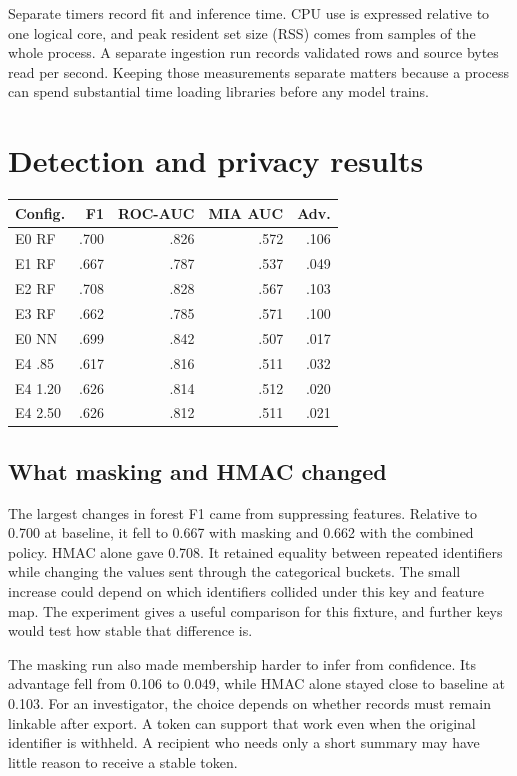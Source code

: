 \documentclass[conference]{IEEEtran}
\makeatletter
\newcommand{\papertable}[2]{\par\medskip\noindent\begin{minipage}{\columnwidth}
\def\@captype{table}\centering\caption{#1}{\footnotesize #2}
\end{minipage}\smallskip\par}
\makeatother
\begin{document}
Separate timers record fit and inference time. CPU use is expressed relative to one logical core, and peak resident set size (RSS) comes from samples of the whole process. A separate ingestion run records validated rows and source bytes read per second. Keeping those measurements separate matters because a process can spend substantial time loading libraries before any model trains.

\clearpage
\section{Detection and privacy results}
\papertable{Detection and membership means across three seeds. The detection holdout contains 2,000 rows.}{
\begin{tabular}{lrrrr}
\toprule
Config. & F1 & ROC-AUC & MIA AUC & Adv.\\ \midrule
E0 RF & .700 & .826 & .572 & .106\\
E1 RF & .667 & .787 & .537 & .049\\
E2 RF & .708 & .828 & .567 & .103\\
E3 RF & .662 & .785 & .571 & .100\\
E0 NN & .699 & .842 & .507 & .017\\
E4 .85 & .617 & .816 & .511 & .032\\
E4 1.20 & .626 & .814 & .512 & .020\\
E4 2.50 & .626 & .812 & .511 & .021\\
\bottomrule
\end{tabular}}

\subsection{What masking and HMAC changed}
The largest changes in forest F1 came from suppressing features. Relative to 0.700 at baseline, it fell to 0.667 with masking and 0.662 with the combined policy. HMAC alone gave 0.708. It retained equality between repeated identifiers while changing the values sent through the categorical buckets. The small increase could depend on which identifiers collided under this key and feature map. The experiment gives a useful comparison for this fixture, and further keys would test how stable that difference is.

The masking run also made membership harder to infer from confidence. Its advantage fell from 0.106 to 0.049, while HMAC alone stayed close to baseline at 0.103. For an investigator, the choice depends on whether records must remain linkable after export. A token can support that work even when the original identifier is withheld. A recipient who needs only a short summary may have little reason to receive a stable token.
\end{document}
